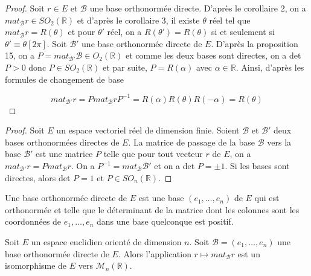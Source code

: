 \begin{proof}

Soit $r \in E$ et $\mathcal{B}$ une base orthonormée directe. D'après le corollaire 2, on a $mat_{\mathcal{B}} r \in SO_2(\mathbb{R})$ et d'après le corollaire 3, il existe $\theta$ réel tel que $mat_{\mathcal{B}} r = R(\theta)$ et pour $\theta'$ réel, on a $R(\theta') = R(\theta)$ si et seulement si $\theta' \equiv \theta [2\pi]$. Soit $\mathcal{B}'$ une base orthonormée directe de $E$. D'après la proposition 15, on a $P = mat_{\mathcal{B}'} \mathcal{B} \in O_2(\mathbb{R})$ et comme les deux bases sont directes, on a det $P > 0$ donc $P \in SO_2(\mathbb{R})$ et par suite, $P = R(\alpha)$ avec $\alpha \in \mathbb{R}$. Ainsi, d'après les formules de changement de base

\[
mat_{\mathcal{B}'} r = P mat_{\mathcal{B}} r P^{-1} = R(\alpha) R(\theta) R(-\alpha) = R(\theta)
\]

\end{proof}

\begin{proof}

Soit $E$ un espace vectoriel réel de dimension finie. Soient $\mathcal{B}$ et $\mathcal{B}'$ deux bases orthonormées directes de $E$. La matrice de passage de la base $\mathcal{B}$ vers la base $\mathcal{B}'$ est une matrice $P$ telle que pour tout vecteur $r$ de $E$, on a $mat_{\mathcal{B}'} r = P mat_{\mathcal{B}} r$. On a $P^{-1} = mat_{\mathcal{B}} \mathcal{B}'$ et on a det $P = \pm 1$. Si les bases sont directes, alors det $P = 1$ et $P \in SO_n(\mathbb{R})$.

\end{proof}

\begin{remark}

Une base orthonormée directe de $E$ est une base $(e_1, \dots, e_n)$ de $E$ qui est orthonormée et telle que le déterminant de la matrice dont les colonnes sont les coordonnées de $e_1, \dots, e_n$ dans une base quelconque est positif.

\end{remark}

\begin{proposition}
\label{prop:21}

Soit $E$ un espace euclidien orienté de dimension $n$. Soit $\mathcal{B} = (e_1, \dots, e_n)$ une base orthonormée directe de $E$. Alors l'application $r \mapsto mat_{\mathcal{B}} r$ est un isomorphisme de $E$ vers $\mathcal{M}_n(\mathbb{R})$.

\end{proposition}

